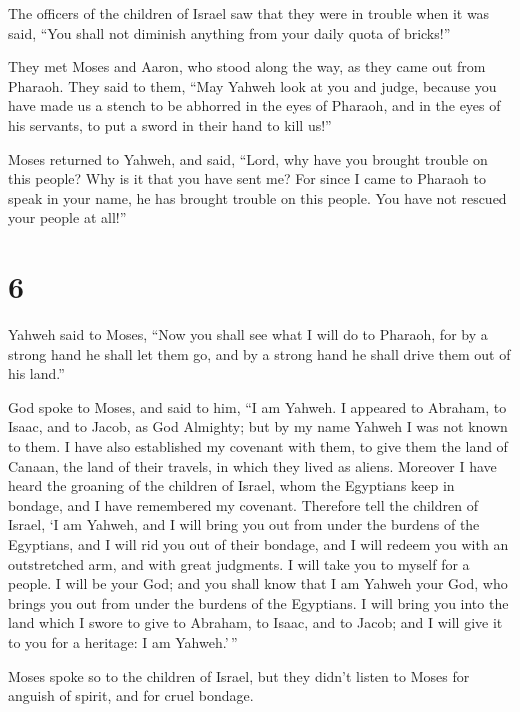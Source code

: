  The officers of the children of Israel saw that they were
in trouble when it was said, ``You shall not diminish anything from your
daily quota of bricks!''

 They met Moses and Aaron, who stood along the way, as they
came out from Pharaoh.  They said to them, ``May Yahweh
look at you and judge, because you have made us a stench to be abhorred
in the eyes of Pharaoh, and in the eyes of his servants, to put a sword
in their hand to kill us!''

 Moses returned to Yahweh, and said, ``Lord, why have you
brought trouble on this people? Why is it that you have sent me?
 For since I came to Pharaoh to speak in your name, he has
brought trouble on this people. You have not rescued your people at
all!''

\hypertarget{section-5}{%
\section{6}\label{section-5}}

 Yahweh said to Moses, ``Now you shall see what I will do to
Pharaoh, for by a strong hand he shall let them go, and by a strong hand
he shall drive them out of his land.''

 God spoke to Moses, and said to him, ``I am Yahweh.
 I appeared to Abraham, to Isaac, and to Jacob, as God
Almighty; but by my name Yahweh I was not known to them.  I
have also established my covenant with them, to give them the land of
Canaan, the land of their travels, in which they lived as aliens.
 Moreover I have heard the groaning of the children of
Israel, whom the Egyptians keep in bondage, and I have remembered my
covenant.  Therefore tell the children of Israel, `I am
Yahweh, and I will bring you out from under the burdens of the
Egyptians, and I will rid you out of their bondage, and I will redeem
you with an outstretched arm, and with great judgments.  I
will take you to myself for a people. I will be your God; and you shall
know that I am Yahweh your God, who brings you out from under the
burdens of the Egyptians.  I will bring you into the land
which I swore to give to Abraham, to Isaac, and to Jacob; and I will
give it to you for a heritage: I am Yahweh.'\,''

 Moses spoke so to the children of Israel, but they didn't
listen to Moses for anguish of spirit, and for cruel bondage.

